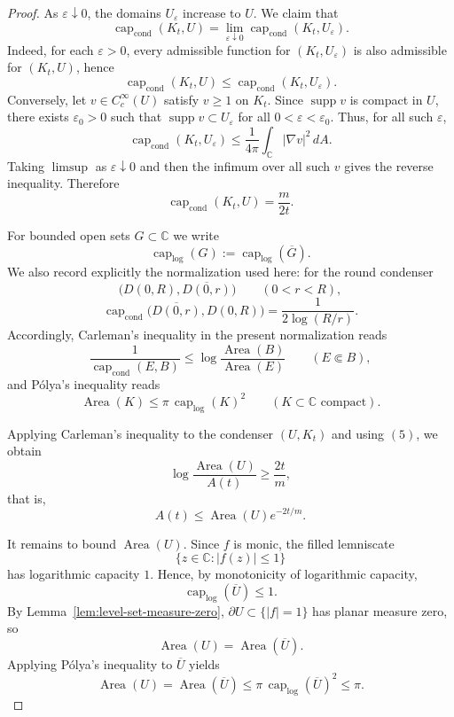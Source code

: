 \documentclass[12pt]{amsart}
\theoremstyle{definition}
\theoremstyle{remark}
\begin{document}
\begin{proof}
As $\varepsilon\downarrow 0$, the domains $U_\varepsilon$ increase to $U$. We claim that
\[
\operatorname{cap}_{\mathrm{cond}}(K_t,U)
=
\lim_{\varepsilon\downarrow 0}\operatorname{cap}_{\mathrm{cond}}(K_t,U_\varepsilon).
\]
Indeed, for each $\varepsilon>0$, every admissible function for $(K_t,U_\varepsilon)$
is also admissible for $(K_t,U)$, hence
\[
\operatorname{cap}_{\mathrm{cond}}(K_t,U)
\le
\operatorname{cap}_{\mathrm{cond}}(K_t,U_\varepsilon).
\]
Conversely, let $v\in C_c^\infty(U)$ satisfy $v\ge 1$ on $K_t$. Since $\operatorname{supp}v$
is compact in $U$, there exists $\varepsilon_0>0$ such that $\operatorname{supp}v\subset U_\varepsilon$
for all $0<\varepsilon<\varepsilon_0$. Thus, for all such $\varepsilon$,
\[
\operatorname{cap}_{\mathrm{cond}}(K_t,U_\varepsilon)
\le
\frac1{4\pi}\int_{\mathbb C} |\nabla v|^2\,dA.
\]
Taking $\limsup$ as $\varepsilon\downarrow 0$ and then the infimum over all such $v$
gives the reverse inequality. Therefore
\begin{equation}
\tag{5}
\operatorname{cap}_{\mathrm{cond}}(K_t,U)=\frac{m}{2t}.
\end{equation}


For bounded open sets $G\subset\mathbb C$ we write
\[
\operatorname{cap}_{\log}(G):=\operatorname{cap}_{\log}(\overline G).
\]
We also record explicitly the normalization used here: for the round condenser
\[
\bigl(D(0,R),\overline{D(0,r)}\bigr)
\qquad (0<r<R),
\]
\[
\operatorname{cap}_{\mathrm{cond}}\bigl(\overline{D(0,r)},D(0,R)\bigr)
=
\frac{1}{2\log(R/r)}.
\]
Accordingly, Carleman's inequality in the present normalization reads
\[
\frac{1}{\operatorname{cap}_{\mathrm{cond}}(E,B)}
\le
\log\frac{\operatorname{Area}(B)}{\operatorname{Area}(E)}
\qquad (E\Subset B),
\]
and P\'olya's inequality reads
\[
\operatorname{Area}(K)\le \pi\,\operatorname{cap}_{\log}(K)^2
\qquad (K\subset\mathbb C \text{ compact}).
\]

Applying Carleman's inequality to the condenser \((U,K_t)\) and using \((5)\), we obtain
\[
\log \frac{\operatorname{Area}(U)}{A(t)} \ge \frac{2t}{m},
\]
that is,
\[
A(t)\le \operatorname{Area}(U)e^{-2t/m}.
\tag{6}
\]

It remains to bound \(\operatorname{Area}(U)\). Since \(f\) is monic, the filled lemniscate
\[
\{z\in\mathbb C: |f(z)|\le 1\}
\]
has logarithmic capacity \(1\). Hence, by monotonicity of logarithmic capacity,
\[
\operatorname{cap}_{\log}(\overline U)\le 1.
\]
By Lemma~\ref{lem:level-set-measure-zero}, \(\partial U\subset \{|f|=1\}\) has planar measure zero, so
\[
\operatorname{Area}(U)=\operatorname{Area}(\overline U).
\]
Applying Pólya's inequality to \(\overline U\) yields
\[
\operatorname{Area}(U)=\operatorname{Area}(\overline U)
\le
\pi\,\operatorname{cap}_{\log}(\overline U)^2
\le \pi.
\tag{7}
\]


\end{proof}
\end{document}
